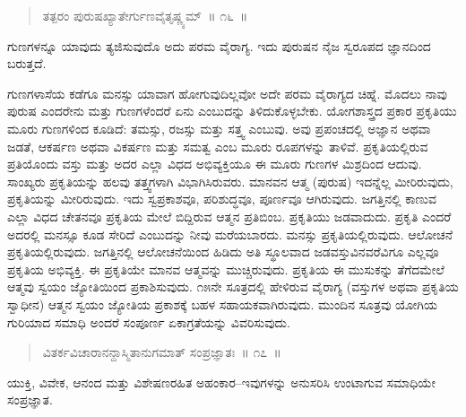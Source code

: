 \vspace{-0.3cm}

\begin{verse}
ತತ್ಪರಂ ಪುರುಷಖ್ಯಾತೇರ್ಗುಣವೈತೃಷ್ಣ್ಯಮ್​~॥ ೧೬~॥
\end{verse}

\vspace{-0.3cm}

ಗುಣಗಳನ್ನೂ ಯಾವುದು ತ್ಯಜಿಸುವುದೊ ಅದು ಪರಮ ವೈರಾಗ್ಯ. ಇದು ಪುರುಷನ ನೈಜ ಸ್ವರೂಪದ ಜ್ಞಾನದಿಂದ ಬರುತ್ತದೆ. 

ಗುಣಗಳಾಸೆಯ ಕಡೆಗೂ ಮನಸ್ಸು ಯಾವಾಗ ಹೋಗುವುದಿಲ್ಲವೋ ಅದೇ ಪರಮ ವೈರಾಗ್ಯದ ಚಿಹ್ನೆ. ಮೊದಲು ನಾವು ಪುರುಷ ಎಂದರೇನು ಮತ್ತು ಗುಣಗಳೆಂದರೆ ಏನು ಎಂಬುದನ್ನು ತಿಳಿದುಕೊಳ್ಳಬೇಕು. ಯೋಗಶಾಸ್ತ್ರದ ಪ್ರಕಾರ ಪ್ರಕೃತಿಯು ಮೂರು ಗುಣಗಳಿಂದ ಕೂಡಿದೆ: ತಮಸ್ಸು, ರಜಸ್ಸು ಮತ್ತು ಸತ್ತ್ವ ಎಂಬುವು. ಅವು ಪ್ರಪಂಚದಲ್ಲಿ ಅಜ್ಞಾನ ಅಥವಾ ಜಡತೆ, ಆಕರ್ಷಣ ಅಥವಾ ವಿಕರ್ಷಣ ಮತ್ತು ಸಮತ್ವ ಎಂಬ ಮೂರು ರೂಪಗಳನ್ನು ತಾಳಿವೆ. ಪ್ರಕೃತಿಯಲ್ಲಿರುವ ಪ್ರತಿಯೊಂದು ವಸ್ತು ಮತ್ತು ಅದರ ಎಲ್ಲಾ ವಿಧದ ಅಭಿವ್ಯಕ್ತಿಯೂ ಈ ಮೂರು ಗುಣಗಳ ಮಿಶ್ರದಿಂದ ಆದುವು. ಸಾಂಖ್ಯರು ಪ್ರಕೃತಿಯನ್ನು ಹಲವು ತತ್ತ್ವಗಳಾಗಿ ವಿಭಾಗಿಸಿರುವರು. ಮಾನವನ ಆತ್ಮ (ಪುರುಷ) ಇದನ್ನೆಲ್ಲ ಮೀರಿರುವುದು, ಪ್ರಕೃತಿಯನ್ನು ಮೀರಿರುವುದು. ಇದು ಸ್ವಪ್ರಕಾಶವೂ, ಪರಿಶುದ್ಧವೂ, ಪೂರ್ಣವೂ ಆಗಿರುವುದು. ಜಗತ್ತಿನಲ್ಲಿ ಕಾಣುವ ಎಲ್ಲಾ ವಿಧದ ಚೇತನವೂ ಪ್ರಕೃತಿಯ ಮೇಲೆ ಬಿದ್ದಿರುವ ಆತ್ಮನ ಪ್ರತಿಬಿಂಬ. ಪ್ರಕೃತಿಯು ಜಡವಾದುದು. ಪ್ರಕೃತಿ ಎಂದರೆ ಅದರಲ್ಲಿ ಮನಸ್ಸೂ ಕೂಡ ಸೇರಿದೆ ಎಂಬುದನ್ನು ನೀವು ಮರೆಯಬಾರದು. ಮನಸ್ಸು ಪ್ರಕೃತಿಯಲ್ಲಿರುವುದು. ಆಲೋಚನೆ ಪ್ರಕೃತಿಯಲ್ಲಿರುವುದು. ಜಗತ್ತಿನಲ್ಲಿ ಆಲೋಚನೆಯಿಂದ ಹಿಡಿದು ಅತಿ ಸ್ಥೂಲವಾದ ಜಡವಸ್ತುವಿನವರೆವಿಗೂ ಎಲ್ಲವೂ ಪ್ರಕೃತಿಯ ಅಭಿವ್ಯಕ್ತಿ. ಈ ಪ್ರಕೃತಿಯೇ ಮಾನವ ಆತ್ಮವನ್ನು ಮುಚ್ಚಿರುವುದು. ಪ್ರಕೃತಿಯ ಈ ಮುಸುಕನ್ನು ತೆಗೆದಮೇಲೆ ಆತ್ಮವು ಸ್ವಯಂ ಜ್ಯೋತಿಯಿಂದ ಪ್ರಕಾಶಿಸುವುದು. ೧೫ನೇ ಸೂತ್ರದಲ್ಲಿ ಹೇಳಿರುವ ವೈರಾಗ್ಯ (ವಸ್ತುಗಳ ಅಥವಾ ಪ್ರಕೃತಿಯ ಸ್ವಾಧೀನ) ಆತ್ಮನ ಸ್ವಯಂ ಜ್ಯೋತಿಯ ಪ್ರಕಾಶಕ್ಕೆ ಬಹಳ ಸಹಾಯಕವಾಗಿರುವುದು. ಮುಂದಿನ ಸೂತ್ರವು ಯೋಗಿಯ ಗುರಿಯಾದ ಸಮಾಧಿ ಅಂದರೆ ಸಂಪೂರ್ಣ ಏಕಾಗ್ರತೆಯನ್ನು ವಿವರಿಸುವುದು. 

\vspace{-0.2cm}

\begin{verse}
ವಿತರ್ಕವಿಚಾರಾನನ್ದಾಸ್ಮಿತಾನುಗಮಾತ್​ ಸಂಪ್ರಜ್ಞಾತಃ~॥ ೧೭~॥
\end{verse}

\vspace{-0.2cm}

ಯುಕ್ತಿ, ವಿವೇಕ, ಆನಂದ ಮತ್ತು ವಿಶೇಷಣರಹಿತ ಅಹಂಕಾರ–ಇವುಗಳನ್ನು ಅನುಸರಿಸಿ ಉಂಟಾಗುವ ಸಮಾಧಿಯೇ ಸಂಪ್ರಜ್ಞಾತ. 


